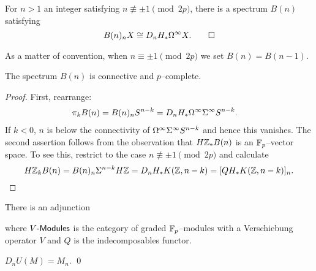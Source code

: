 \begin{corollary}
For $n > 1$ an integer satisfying $n \not\equiv \pm 1 \pmod{2p}$, there is a spectrum $B(n)$ satisfying \[B(n)_n X \cong D_n H_* \Omega^\infty X. \qed\]
\end{corollary}

\begin{remark}
As a matter of convention, when $n \equiv \pm 1 \pmod{2p}$ we set $B(n) = B(n-1)$.
\end{remark}


\begin{lemma}
The spectrum $B(n)$ is connective and $p$--complete.
\end{lemma}
\begin{proof}
First, rearrange:
\begin{align*}
\pi_k B(n) & = B(n)_n S^{n-k} = D_n H_* \Omega^\infty \Sigma^\infty S^{n-k}.
\end{align*}
If $k < 0$, $n$ is below the connectivity of $\Omega^\infty \Sigma^\infty S^{n-k}$ and hence this vanishes.  The second assertion follows from the observation that $H\mathbb Z_* B(n)$ is an $\mathbb F_p$--vector space.  To see this, restrict to the case $n \not\equiv \pm 1 \pmod{2p}$ and calculate \[H\mathbb Z_k B(n) = B(n)_n \Sigma^{n-k} H\mathbb Z = D_n H_* K(\mathbb Z, n-k) = [QH_* K(\mathbb Z, n-k)]_n. \qedhere\]
\end{proof}


\begin{definition}
There is an adjunction 
\begin{center}
\end{center}
where $V{\text{-}}\mathsf{Modules}$ is the category of graded $\mathbb F_p$--modules with a Verschiebung operator $V$ and $Q$ is the indecomposables functor.
\end{definition}

\begin{lemma}
$D_n U(M) = M_n$. \qed
\end{lemma}

